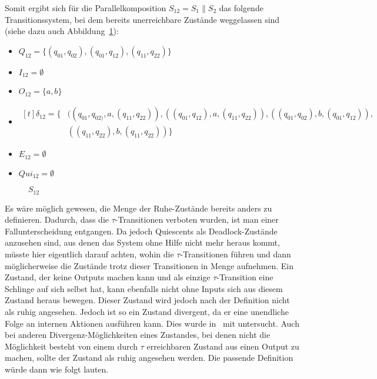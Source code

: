 Somit ergibt sich für die Parallelkomposition $S_{12} = S_1\| S_2$ das folgende
Transitionssystem, bei dem bereits unerreichbare Zustände weggelassen sind
(siehe dazu auch Abbildung~\ref{S12}):
\begin{itemize}
  \item $Q_{12}=\{(q_{01},q_{02}), (q_{01},q_{12}), (q_{11},q_{22})\}$
  \item $I_{12}=\emptyset$
  \item $O_{12}=\{a,b\}$
  \item $\begin{aligned}[t]
      \delta _{12} = \{&((q_{01},q_{02)},a,(q_{11},q_{22})),
      ((q_{01},q_{12}),a,(q_{11},q_{22})),
    ((q_{01},q_{02}),b,(q_{01},q_{12})),\\
  &((q_{11},q_{22}),b,(q_{11},q_{22}))\}
        \end{aligned}$
  \item $E_{12}=\emptyset$
  \item $Qui_{12}=\emptyset$
\end{itemize}
\begin{figure} [h!tbp]
\begin{center}
  \caption{$S_{12}$}
  \label{S12}
\end{center}
\end{figure}

Es wäre möglich gewesen, die Menge der Ruhe-Zustände bereits anders zu
definieren. Dadurch, dass die $\tau$-Transitionen verboten wurden, ist man
einer Fallunterscheidung entgangen. Da jedoch Quiescents als Deadlock-Zustände
anzusehen sind, aus denen das System ohne Hilfe nicht mehr heraus kommt,
müsste hier eigentlich darauf achten, wohin die $\tau$-Transitionen führen
und dann möglicherweise die Zustände trotz dieser Transitionen in Menge
aufnehmen. Ein Zustand, der keine Outputs machen kann und als einzige
$\tau$-Transition eine Schlinge auf sich selbst hat, kann ebenfalls nicht ohne
Inputs sich aus diesem Zustand heraus bewegen. Dieser Zustand wird jedoch nach
der Definition nicht als ruhig angesehen. Jedoch ist so ein Zustand
divergent, da er eine unendliche Folge an internen Aktionen ausführen kann.
Dies wurde in~\cite{Chilton2013} mit untersucht. Auch bei anderen
Divergenz-Möglichkeiten eines Zustandes, bei denen nicht die Möglichkeit
besteht von einem durch $\tau$ erreichbaren Zustand aus einen Output zu machen,
sollte der Zustand als ruhig angesehen werden. Die passende Definition würde
dann wie folgt lauten.

